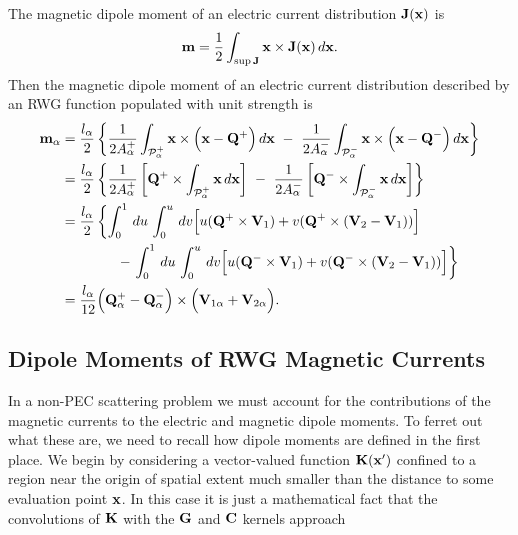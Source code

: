 \documentclass[letterpaper]{article}
\begin{document}
The magnetic dipole moment of an electric current distribution $\mathbf{J}(\mathbf{x})$ is 
$$\mathbf{m}= \frac{1}{2} \int_{\sup \mathbf{J}}  \mathbf{x} \times \mathbf{J}(\mathbf{x}) \,d\mathbf{x}. $$
Then the magnetic dipole moment of an electric current distribution 
described by an RWG function populated with unit strength is 
\begin{align*}
  \mathbf{m}_\alpha 
&= \frac{l_\alpha}{2}
   \left\{ 
   \frac{1}{2A^+_\alpha} \int_{\mathcal{P}_\alpha^+} 
                         \mathbf{x} \times \Big(\mathbf{x}-\mathbf{Q}^+\Big) 
                         \,d\mathbf{x}  
   \,\,- \,\,
   \frac{1}{2A^-_\alpha} \int_{\mathcal{P}_\alpha^-} 
                         \mathbf{x} \times \Big(\mathbf{x}-\mathbf{Q}^-\Big) 
                         \,d\mathbf{x}  
   \right\}  \\
&= \frac{l_\alpha}{2}
   \left\{ 
   \frac{1}{2A^+_\alpha} 
     \left[\mathbf{Q}^+ \times \int_{\mathcal{P}_\alpha^+} \mathbf{x} \,d\mathbf{x}  \right]
   \,\,- \,\,
   \frac{1}{2A^-_\alpha} 
     \left[ \mathbf{Q}^- \times \int_{\mathcal{P}_\alpha^-} \mathbf{x} \,d\mathbf{x} \right]
   \right\}\\
&= \frac{l_\alpha}{2}
   \left\{ 
            \int_0^1 \,du\,\int_0^u \, dv 
            \Big[  u(\mathbf{Q}^+ \times \mathbf{V}_1) 
                  +v(\mathbf{Q}^+ \times (\mathbf{V}_2 - \mathbf{V}_1)) 
            \Big]
   \right. \\
&  \qquad \qquad- 
   \left. 
            \int_0^1 \,du\,\int_0^u \, dv 
            \Big[  u(\mathbf{Q}^- \times \mathbf{V}_1) 
                  +v(\mathbf{Q}^- \times (\mathbf{V}_2 - \mathbf{V}_1)) 
            \Big]
   \right\} \\
&= \frac{l_\alpha}{12}
   \Big(\mathbf{Q}^+_\alpha - \mathbf{Q}^-_\alpha\Big) \times 
   \Big(\mathbf{V}_{1\alpha} + \mathbf{V}_{2\alpha}\Big).
\end{align*}

\subsection{Dipole Moments of RWG Magnetic Currents}

In a non-PEC scattering problem we must account for the 
contributions of the magnetic currents to the electric
and magnetic dipole moments. To ferret out what these
are, we need to recall how dipole moments are defined
in the first place. We begin by considering a 
vector-valued function $\mathbf{K}(\mathbf{x}^\prime)$ 
confined to a region near the origin of spatial extent 
much smaller than the distance to some evaluation point 
$\mathbf{x}$. In this case it is just a mathematical fact that 
the convolutions of $\mathbf{K}$ with the $\mathbf{G}$ and $\mathbf{C}$
kernels approach 
\end{document}
